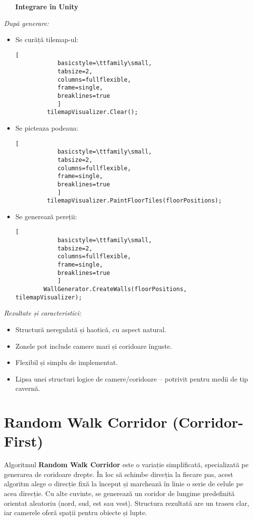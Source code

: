 \documentclass{article}
\begin{document}
 \newline
 
	\textbf{Integrare în Unity}
	
	\textit{După generare:}
	\begin{itemize}
		\item Se curăță tilemap-ul:
							\begin{lstlisting}[
			basicstyle=\ttfamily\small, 
			tabsize=2, 
			columns=fullflexible,
			frame=single,
			breaklines=true
			]
		 tilemapVisualizer.Clear();
		\end{lstlisting}

		\item Se picteaza podeaua:
					\begin{lstlisting}[
			basicstyle=\ttfamily\small, 
			tabsize=2, 
			columns=fullflexible,
			frame=single,
			breaklines=true
			]
		 tilemapVisualizer.PaintFloorTiles(floorPositions);
		\end{lstlisting}

		\item 	Se generează pereții:	
			\begin{lstlisting}[
			basicstyle=\ttfamily\small, 
			tabsize=2, 
			columns=fullflexible,
			frame=single,
			breaklines=true
			]
		WallGenerator.CreateWalls(floorPositions, tilemapVisualizer);
		\end{lstlisting}

	\end{itemize}
	
	\textit{Rezultate și caracteristici:}
	\begin{itemize}
	\item  Structură neregulată și haotică, cu aspect natural.
	\item  Zonele pot include camere mari și coridoare înguste.
	\item  Flexibil și simplu de implementat.
	\item  Lipsa unei structuri logice de camere/coridoare – potrivit pentru medii de tip cavernă.
\end{itemize}



	\section{ Random Walk Corridor (Corridor-First)}
	\tab Algoritmul \textbf{Random Walk Corridor} este o variație simplificată, specializată pe generarea de coridoare drepte. În loc să schimbe direcția la fiecare pas, acest algoritm alege o direcție fixă la început și marchează în linie o serie de celule pe acea direcție. Cu alte cuvinte, se generează un coridor de lungime predefinită orientat aleatoriu (nord, sud, est sau vest). \cite{kaiser-corridor}
	Structura rezultată are un traseu clar, iar camerele oferă spații pentru obiecte și lupte.
	
\end{document}
